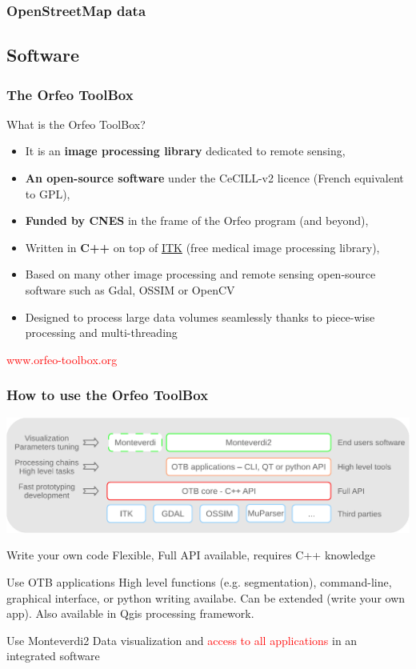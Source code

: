 \documentclass[8pt]{beamer}
\begin{document}
\begin{frame}
\frametitle{OpenStreetMap data}
\end{frame}

\subsection{Software}
\begin{frame}
\frametitle{The Orfeo ToolBox}
\begin{block}{What is the Orfeo ToolBox?}
\begin{itemize}
\item It is an \textbf{image processing library} dedicated to remote sensing,
\item \textbf{An open-source software} under the CeCILL-v2 licence (French equivalent to GPL),
\item \textbf{Funded by CNES} in the frame of the Orfeo program (and beyond),
\item Written in \textbf{C++} on top of \href{www.itk.org}{ITK} (free medical image processing library),
\item Based on many other image processing and remote sensing open-source software such as Gdal, OSSIM or OpenCV
\item Designed to process large data volumes seamlessly thanks to piece-wise processing and multi-threading
\end{itemize}
\end{block}
\begin{center}
{\huge\textcolor{red}{www.orfeo-toolbox.org}}
\end{center}
\end{frame}


\begin{frame}
\frametitle{How to use the Orfeo ToolBox}
\vspace{-0.5cm}
\begin{center}
\includegraphics[width=\textwidth]{../OTB-General/images/sandwich.pdf}
\end{center}
\vspace{-0.5cm}
\begin{block}{Write your own code}
 Flexible, Full API available, requires C++ knowledge
\end{block}
\begin{block}{Use OTB applications}
  High level functions (e.g. segmentation), command-line, graphical interface, or python writing availabe. Can be extended (write your own app). Also available in Qgis processing framework.
\end{block}
\begin{block}{Use Monteverdi2}
Data visualization and  \textcolor{red}{access to all applications} in an integrated software
\end{block}
\end{frame}
\end{document}
